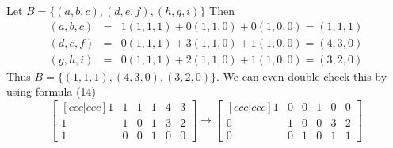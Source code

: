 \begin{solution}
Let $B = \{(a,b,c),(d,e,f),(h,g,i)\}$
Then
\begin{eqnarray*}
(a,b,c) &=& 1(1,1,1) + 0(1,1,0) + 0(1,0,0) = (1,1,1)\\
(d,e,f) &=& 0(1,1,1) + 3(1,1,0) + 1(1,0,0) = (4,3,0)\\
(g,h,i) &=& 0(1,1,1) + 2(1,1,0) + 1(1,0,0) = (3,2,0)
\end{eqnarray*}
Thus $B = \{(1,1,1),(4,3,0),(3,2,0)\}$. We can even double check this by using formula (14)
$$
\begin{bmatrix}[ccc|ccc]
1&1&1&1&4&3\\
1&1&0&1&3&2\\
1&0&0&1&0&0
\end{bmatrix}
\rightarrow
\begin{bmatrix}[ccc|ccc]
1&0&0&1&0&0\\
0&1&0&0&3&2\\
0&0&1&0&1&1
\end{bmatrix}
$$
\end{solution}

